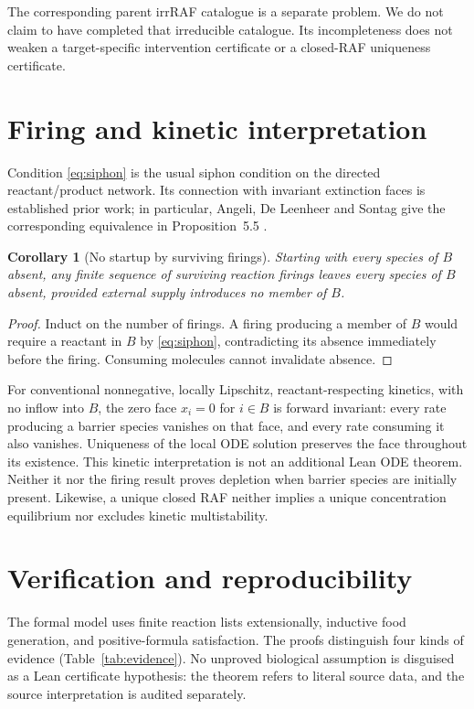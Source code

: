 \documentclass[11pt]{article}
\newtheorem{corollary}[theorem]{Corollary}
\theoremstyle{definition}\newtheorem{definition}[theorem]{Definition}
\begin{document}
The corresponding parent irrRAF catalogue is a separate problem. We do not claim to have completed that irreducible catalogue. Its incompleteness does not weaken a target-specific intervention certificate or a closed-RAF uniqueness certificate.

\section{Firing and kinetic interpretation}
Condition \eqref{eq:siphon} is the usual siphon condition on the directed reactant/product network. Its connection with invariant extinction faces is established prior work; in particular, Angeli, De Leenheer and Sontag give the corresponding equivalence in Proposition~5.5 \cite{angeli2006}.

\begin{corollary}[No startup by surviving firings]
Starting with every species of $B$ absent, any finite sequence of surviving reaction firings leaves every species of $B$ absent, provided external supply introduces no member of $B$.
\end{corollary}
\begin{proof}
Induct on the number of firings. A firing producing a member of $B$ would require a reactant in $B$ by \eqref{eq:siphon}, contradicting its absence immediately before the firing. Consuming molecules cannot invalidate absence.
\end{proof}

For conventional nonnegative, locally Lipschitz, reactant-respecting kinetics, with no inflow into $B$, the zero face $x_i=0$ for $i\in B$ is forward invariant: every rate producing a barrier species vanishes on that face, and every rate consuming it also vanishes. Uniqueness of the local ODE solution preserves the face throughout its existence. This kinetic interpretation is not an additional Lean ODE theorem. Neither it nor the firing result proves depletion when barrier species are initially present. Likewise, a unique closed RAF neither implies a unique concentration equilibrium nor excludes kinetic multistability.

\section{Verification and reproducibility}\label{sec:verification}
The formal model uses finite reaction lists extensionally, inductive food generation, and positive-formula satisfaction. The proofs distinguish four kinds of evidence (Table~\ref{tab:evidence}). No unproved biological assumption is disguised as a Lean certificate hypothesis: the theorem refers to literal source data, and the source interpretation is audited separately.
\end{document}
